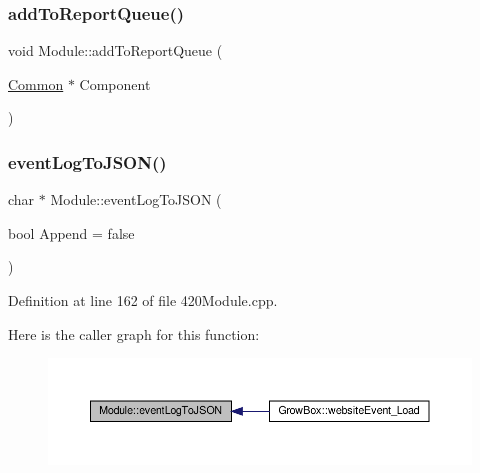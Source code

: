 \subsubsection{\texorpdfstring{add\+To\+Report\+Queue()}{addToReportQueue()}\hspace{0.1cm}{\footnotesize\ttfamily [2/2]}}
{\footnotesize\ttfamily void Module\+::add\+To\+Report\+Queue (\begin{DoxyParamCaption}\item[{\hyperlink{class_common}{Common} $\ast$}]{Component }\end{DoxyParamCaption})}

\mbox{\label{class_module_a3cb3b80bca51541305843ba3e6e7c5c1}} 
\subsubsection{\texorpdfstring{event\+Log\+To\+J\+S\+O\+N()}{eventLogToJSON()}\hspace{0.1cm}{\footnotesize\ttfamily [1/2]}}
{\footnotesize\ttfamily char $\ast$ Module\+::event\+Log\+To\+J\+S\+ON (\begin{DoxyParamCaption}\item[{bool}]{Append = {\ttfamily false} }\end{DoxyParamCaption})\hspace{0.3cm}{\ttfamily [protected]}}



Definition at line 162 of file 420\+Module.\+cpp.

Here is the caller graph for this function\+:
\nopagebreak
\begin{figure}[H]
\begin{center}
\leavevmode
\includegraphics[width=350pt]{class_module_a3cb3b80bca51541305843ba3e6e7c5c1_icgraph}
\end{center}
\end{figure}
\mbox{\label{class_module_a2c92fb9e8e34856ebdea9d1ac1ad4e2b}} 
